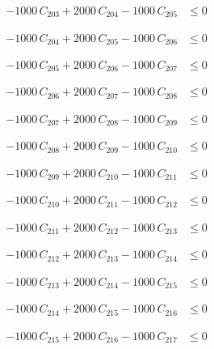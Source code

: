 \documentclass[a4paper,11pt]{article}
\begin{document}
\begin{align}
-1000\,C_{203} + 2000\,C_{204} - 1000\,C_{205} &\leq 0 \nonumber
\end{align}

\begin{align}
-1000\,C_{204} + 2000\,C_{205} - 1000\,C_{206} &\leq 0 \nonumber
\end{align}

\begin{align}
-1000\,C_{205} + 2000\,C_{206} - 1000\,C_{207} &\leq 0 \nonumber
\end{align}

\begin{align}
-1000\,C_{206} + 2000\,C_{207} - 1000\,C_{208} &\leq 0 \nonumber
\end{align}

\begin{align}
-1000\,C_{207} + 2000\,C_{208} - 1000\,C_{209} &\leq 0 \nonumber
\end{align}

\begin{align}
-1000\,C_{208} + 2000\,C_{209} - 1000\,C_{210} &\leq 0 \nonumber
\end{align}

\begin{align}
-1000\,C_{209} + 2000\,C_{210} - 1000\,C_{211} &\leq 0 \nonumber
\end{align}

\begin{align}
-1000\,C_{210} + 2000\,C_{211} - 1000\,C_{212} &\leq 0 \nonumber
\end{align}

\begin{align}
-1000\,C_{211} + 2000\,C_{212} - 1000\,C_{213} &\leq 0 \nonumber
\end{align}

\begin{align}
-1000\,C_{212} + 2000\,C_{213} - 1000\,C_{214} &\leq 0 \nonumber
\end{align}

\begin{align}
-1000\,C_{213} + 2000\,C_{214} - 1000\,C_{215} &\leq 0 \nonumber
\end{align}

\begin{align}
-1000\,C_{214} + 2000\,C_{215} - 1000\,C_{216} &\leq 0 \nonumber
\end{align}

\begin{align}
-1000\,C_{215} + 2000\,C_{216} - 1000\,C_{217} &\leq 0 \nonumber
\end{align}
\end{document}
